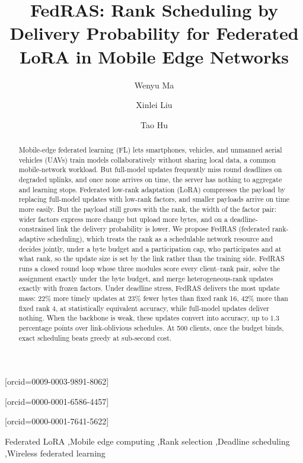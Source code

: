\documentclass[a4paper,fleqn]{cas-dc}
\begin{document}
\title[mode=title]{FedRAS: Rank Scheduling by Delivery Probability for Federated LoRA in Mobile Edge Networks}
\tnotemark[1]
\author[1,2,3]{Wenyu Ma}[orcid=0009-0003-9891-8062]
\author[1,2,3]{Xinlei Liu}[orcid=0000-0001-6586-4457]
\cormark[1]
\author[1,2,3]{Tao Hu}[orcid=0000-0001-7641-5622]
\begin{abstract}
Mobile-edge federated learning (FL) lets smartphones, vehicles, and unmanned aerial vehicles (UAVs) train models collaboratively without sharing local data, a common mobile-network workload. But full-model updates frequently miss round deadlines on degraded uplinks, and once none arrives on time, the server has nothing to aggregate and learning stops. Federated low-rank adaptation (LoRA) compresses the payload by replacing full-model updates with low-rank factors, and smaller payloads arrive on time more easily. But the payload still grows with the rank, the width of the factor pair: wider factors express more change but upload more bytes, and on a deadline-constrained link the delivery probability is lower. We propose FedRAS (federated rank-adaptive scheduling), which treats the rank as a schedulable network resource and decides jointly, under a byte budget and a participation cap, who participates and at what rank, so the update size is set by the link rather than the training side. FedRAS runs a closed round loop whose three modules score every client--rank pair, solve the assignment exactly under the byte budget, and merge heterogeneous-rank updates exactly with frozen factors. Under deadline stress, FedRAS delivers the most update mass: 22\% more timely updates at 23\% fewer bytes than fixed rank 16, 42\% more than fixed rank 4, at statistically equivalent accuracy, while full-model updates deliver nothing. When the backbone is weak, these updates convert into accuracy, up to 1.3 percentage points over link-oblivious schedules. At 500 clients, once the budget binds, exact scheduling beats greedy at sub-second cost.
\end{abstract}
\begin{keywords}
Federated LoRA \sep Mobile edge computing \sep Rank selection \sep Deadline scheduling \sep Wireless federated learning
\end{keywords}
\maketitle
\end{document}

